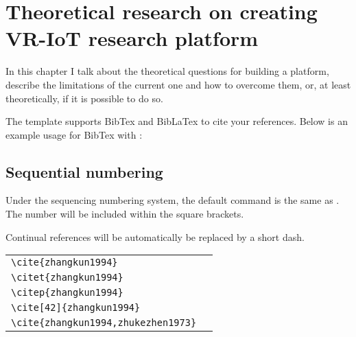 
\chapter{Theoretical research on creating VR-IoT research platform}

In this chapter I talk about the theoretical questions for building a platform, describe the limitations of the current one and how to overcome them, or, at least theoretically, if it is possible to do so.

The template supports BibTex and BibLaTex to cite your references. Below is an example usage for BibTex with :


\section{Sequential numbering}

Under the sequencing numbering system, the default  command is the same as . The number will be included within the square brackets.

Continual references will be automatically be replaced by a short dash.

\begin{tabular}{l@{\quad$\Rightarrow$\quad}l}
  \verb|\cite{zhangkun1994}|               & \cite{zhangkun1994}               \\
  \verb|\citet{zhangkun1994}|              & \citet{zhangkun1994}              \\
  \verb|\citep{zhangkun1994}|              & \citep{zhangkun1994}              \\
  \verb|\cite[42]{zhangkun1994}|           & \cite[42]{zhangkun1994}           \\
  \verb|\cite{zhangkun1994,zhukezhen1973}| & \cite{zhangkun1994,zhukezhen1973} \\
\end{tabular}





